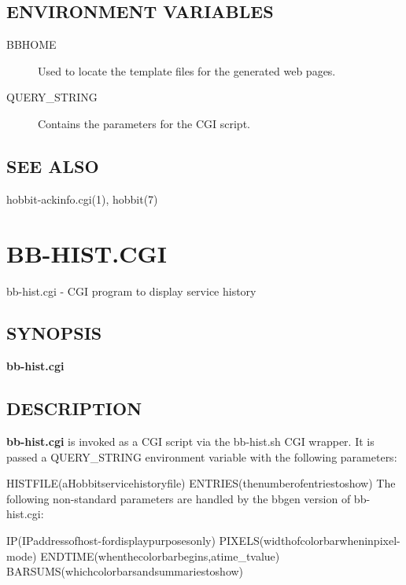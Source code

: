 \subsection{ENVIRONMENT VARIABLES}
\begin{description}
\item[BBHOME] Used to locate the template files for the generated web pages. 

 

\item[QUERY\_STRING] Contains the parameters for the CGI script. 

 


\end{description}
\subsection{SEE ALSO}
hobbit-ackinfo.cgi(1), hobbit(7) 

  
%
\newpage
\section{BB-HIST.CGI}

 bb-hist.cgi - CGI program to display service history \subsection{SYNOPSIS}
\textbf{bb-hist.cgi}


 
\subsection{DESCRIPTION}
\textbf{bb-hist.cgi}
 is invoked as a CGI script via the bb-hist.sh CGI wrapper. It is
 passed a QUERY\_STRING environment variable with the following
 parameters: 


  
HISTFILE(aHobbitservicehistoryfile)  
ENTRIES(thenumberofentriestoshow)  
 The following non-standard parameters are handled by the bbgen version of bb-hist.cgi: 


  
IP(IPaddressofhost-fordisplaypurposesonly)  
PIXELS(widthofcolorbarwheninpixel-mode)  
ENDTIME(whenthecolorbarbegins,atime\_tvalue)  
BARSUMS(whichcolorbarsandsummariestoshow) 


